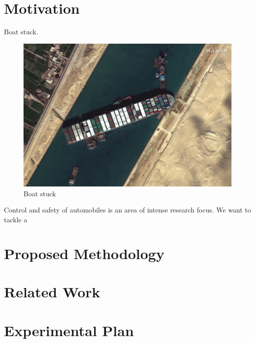 \documentclass[conference]{IEEEtran}
\begin{document}
\section{Motivation}
Boat stuck.
\begin{figure}
    \centering
    \includegraphics{documents/proposal/Suez_Canal_blocked_by_Ever_Given_March_27_2021.jpg}
    \caption{Boat stuck\label{fig:boat_stuck}}
\end{figure}
Control and safety of automobiles is an area of intense research focus. We want to tackle a 
\section{Proposed Methodology}

\section{Related Work}

\section{Experimental Plan}




\end{document}
